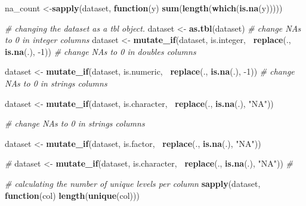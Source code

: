 \documentclass[]{article}
\newenvironment{Shaded}{\begin{snugshade}}{\end{snugshade}}
\newcommand{\CommentTok}[1]{\textcolor[rgb]{0.56,0.35,0.01}{\textit{#1}}}
\newcommand{\ControlFlowTok}[1]{\textcolor[rgb]{0.13,0.29,0.53}{\textbf{#1}}}
\newcommand{\DecValTok}[1]{\textcolor[rgb]{0.00,0.00,0.81}{#1}}
\newcommand{\KeywordTok}[1]{\textcolor[rgb]{0.13,0.29,0.53}{\textbf{#1}}}
\newcommand{\NormalTok}[1]{#1}
\newcommand{\OperatorTok}[1]{\textcolor[rgb]{0.81,0.36,0.00}{\textbf{#1}}}
\newcommand{\StringTok}[1]{\textcolor[rgb]{0.31,0.60,0.02}{#1}}
\begin{document}
\begin{Shaded}
\begin{Highlighting}[]
\NormalTok{  na_count <-}\KeywordTok{sapply}\NormalTok{(dataset, }\ControlFlowTok{function}\NormalTok{(y) }\KeywordTok{sum}\NormalTok{(}\KeywordTok{length}\NormalTok{(}\KeywordTok{which}\NormalTok{(}\KeywordTok{is.na}\NormalTok{(y)))))}
  
  \CommentTok{# changing the dataset as a tbl object.}
\NormalTok{  dataset <-}\StringTok{ }\KeywordTok{as.tbl}\NormalTok{(dataset)}
  \CommentTok{# change NAs to 0 in integer columns}
\NormalTok{  dataset <-}\StringTok{ }\KeywordTok{mutate_if}\NormalTok{(dataset, is.integer, }\OperatorTok{~}\KeywordTok{replace}\NormalTok{(., }\KeywordTok{is.na}\NormalTok{(.), }\DecValTok{-1}\NormalTok{))}
  \CommentTok{# change NAs to 0 in doubles columns}
  
\NormalTok{  dataset <-}\StringTok{ }\KeywordTok{mutate_if}\NormalTok{(dataset, is.numeric, }\OperatorTok{~}\KeywordTok{replace}\NormalTok{(., }\KeywordTok{is.na}\NormalTok{(.), }\DecValTok{-1}\NormalTok{))}
  \CommentTok{# change NAs to 0 in strings columns}
  
\NormalTok{  dataset <-}\StringTok{ }\KeywordTok{mutate_if}\NormalTok{(dataset, is.character, }\OperatorTok{~}\KeywordTok{replace}\NormalTok{(., }\KeywordTok{is.na}\NormalTok{(.), }\StringTok{"NA"}\NormalTok{))}
  
  \CommentTok{# change NAs to 0 in strings columns}
  
\NormalTok{  dataset <-}\StringTok{ }\KeywordTok{mutate_if}\NormalTok{(dataset, is.factor, }\OperatorTok{~}\KeywordTok{replace}\NormalTok{(., }\KeywordTok{is.na}\NormalTok{(.), }\StringTok{"NA"}\NormalTok{))}
  
   \CommentTok{# }
\NormalTok{  dataset <-}\StringTok{ }\KeywordTok{mutate_if}\NormalTok{(dataset, is.character, }\OperatorTok{~}\KeywordTok{replace}\NormalTok{(., }\KeywordTok{is.na}\NormalTok{(.), }\StringTok{"NA"}\NormalTok{))}
  \CommentTok{# }
  
  \CommentTok{# calculating the number of unique levels per column}
  \KeywordTok{sapply}\NormalTok{(dataset, }\ControlFlowTok{function}\NormalTok{(col) }\KeywordTok{length}\NormalTok{(}\KeywordTok{unique}\NormalTok{(col)))}
\end{Highlighting}
\end{Shaded}
\end{document}
